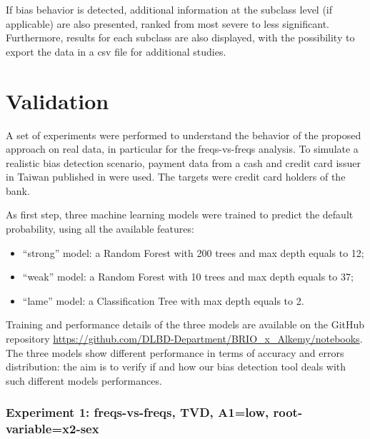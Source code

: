 \documentclass[
]{ceurart}
\begin{document}
If bias behavior is detected, additional information at the subclass level (if applicable) are also presented, ranked from most severe to less significant. Furthermore, results for each subclass are also displayed, with the possibility to export the data in a csv file for additional studies. 

\section{Validation}
\label{sec:validation}

A set of experiments were performed to understand the behavior of the proposed approach on real data, in particular for the freqs-vs-freqs analysis. To simulate a realistic bias detection scenario, payment data from a cash and credit card issuer in Taiwan published in \cite{YEH20092473} were used. The targets were credit card holders of the bank. 

As first step, three machine learning models were trained to predict the default probability, using all the available features:

\begin{itemize}
  \item ``strong'' model: a Random Forest with 200 trees and max depth equals to 12;
  \item ``weak'' model: a Random Forest with 10 trees and max depth equals to 37;
  \item ``lame'' model: a Classification Tree with max depth equals to 2.
\end{itemize}

Training and performance details of the three models are available on the GitHub repository \url{https://github.com/DLBD-Department/BRIO_x_Alkemy/notebooks}. The three models show different performance in terms of accuracy and errors distribution: the aim is to verify if and how our bias detection tool deals with such different models performances. 

\subsubsection{Experiment 1: freqs-vs-freqs, TVD, A1=low, root-variable=x2-sex}
\end{document}
